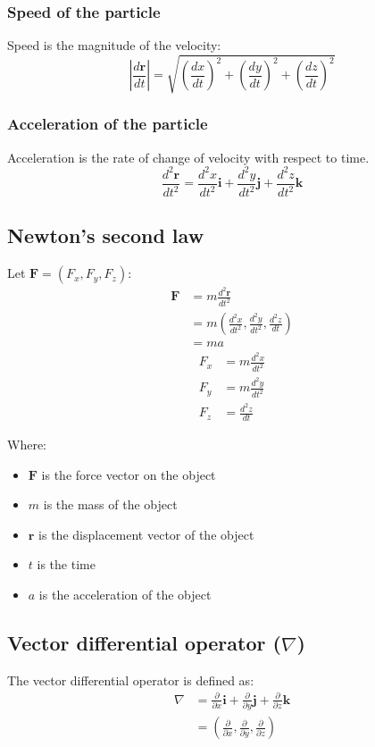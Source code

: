 \documentclass[11pt]{article}
\begin{document}
\subsubsection{Speed of the particle}
\label{sec:org6e4941b}
Speed is the magnitude of the velocity:
\[\left| \frac{d \boldsymbol{r}}{dt} \right| = \sqrt{\left(\frac{dx}{dt} \right)^2 + \left(\frac{dy}{dt} \right)^2 + \left(\frac{dz}{dt} \right)^2}\]

\subsubsection{Acceleration of the particle}
\label{sec:orgbf28220}
Acceleration is the rate of change of velocity with respect to time.
\[\frac{d^2 \boldsymbol{r}}{dt^2} = \frac{d^2 x}{dt^2} \boldsymbol{i} + \frac{d^2 y}{dt^2} \boldsymbol{j} + \frac{d^2 z}{dt^2} \boldsymbol{k}\]

 \newpage

\subsection{Newton's second law}
\label{sec:org7c74f32}
Let \(\boldsymbol{F} = (F_x, F_y, F_z)\):
\begin{align*}
\boldsymbol{F} &= m \frac{d^2 \boldsymbol{r}}{dt^2} \\
&= m \left(\frac{d^2 x}{dt^2}, \frac{d^2 y}{dt^2}, \frac{d^2 z}{dt} \right) \\
&= ma
\end{align*}
\begin{align*}
F_x &= m \frac{d^2 x}{dt^2} \\
F_y &= m \frac{d^2 y}{dt^2} \\
F_z &= \frac{d^2 z}{dt}
\end{align*}

Where:
\begin{itemize}
\item \(\boldsymbol{F}\) is the force vector on the object
\item \(m\) is the mass of the object
\item \(\boldsymbol{r}\) is the displacement vector of the object
\item \(t\) is the time
\item \(a\) is the acceleration of the object
\end{itemize}

\subsection{Vector differential operator (\(\nabla\))}
\label{sec:org6df5695}
The vector differential operator is defined as:
\begin{align*}
\nabla &= \frac{\partial}{\partial x} \boldsymbol{i} + \frac{\partial}{\partial y} \boldsymbol{j} + \frac{\partial}{\partial z} \boldsymbol{k} \\
&= \left(\frac{\partial}{\partial x}, \frac{\partial}{\partial y}, \frac{\partial}{\partial z} \right)
\end{align*}
\end{document}
